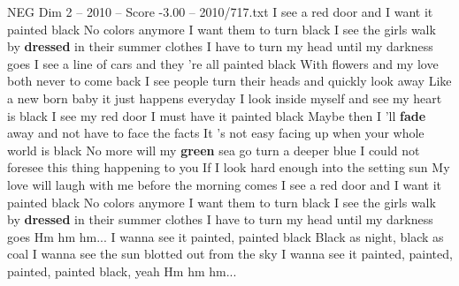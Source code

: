 \begin{textsample}{NEG Dim 2 – 2010 – Score -3.00 – 2010/717.txt}  \label{ex:f2_neg_004}
I see a red door and I want it painted black No colors anymore I want them to turn black I see the girls walk by \textbf{dressed} in their summer clothes I have to turn my head until my darkness goes I see a line of cars and they 're all painted black With flowers and my love both never to come back I see people turn their heads and quickly look away Like a new born baby it just happens everyday I look inside myself and see my heart is black I see my red door I must have it painted black Maybe then I 'll \textbf{fade} away and not have to face the facts It 's not easy facing up when your whole world is black No more will my \textbf{green} sea go turn a deeper blue I could not foresee this thing happening to you If I look hard enough into the setting sun My love will laugh with me before the morning comes I see a red door and I want it painted black No colors anymore I want them to turn black I see the girls walk by \textbf{dressed} in their summer clothes I have to turn my head until my darkness goes Hm hm hm...
I wanna see it painted, painted black Black as night, black as coal I wanna see the sun blotted out from the sky I wanna see it painted, painted, painted, painted black, yeah Hm hm hm...

\end{textsample}
